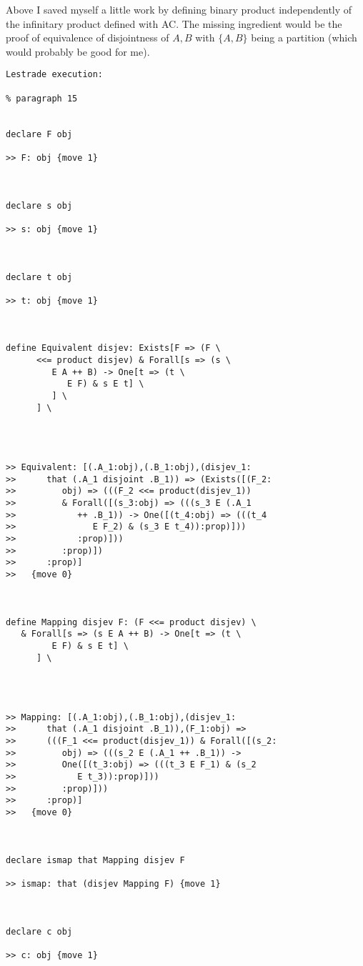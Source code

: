\documentclass[12pt]{article}
\begin{document}
Above I saved myself a little work by defining binary product independently of the infinitary product defined with AC.  The missing ingredient would be the proof of equivalence
of disjointness of $A,B$ with $\{A,B\}$ being a partition (which would probably be good for me).

\begin{verbatim}Lestrade execution:

% paragraph 15


declare F obj

>> F: obj {move 1}



declare s obj

>> s: obj {move 1}



declare t obj

>> t: obj {move 1}



define Equivalent disjev: Exists[F => (F \
      <<= product disjev) & Forall[s => (s \
         E A ++ B) -> One[t => (t \
            E F) & s E t] \
         ] \
      ] \
   



>> Equivalent: [(.A_1:obj),(.B_1:obj),(disjev_1:
>>      that (.A_1 disjoint .B_1)) => (Exists([(F_2:
>>         obj) => (((F_2 <<= product(disjev_1))
>>         & Forall([(s_3:obj) => (((s_3 E (.A_1
>>            ++ .B_1)) -> One([(t_4:obj) => (((t_4
>>               E F_2) & (s_3 E t_4)):prop)]))
>>            :prop)]))
>>         :prop)])
>>      :prop)]
>>   {move 0}



define Mapping disjev F: (F <<= product disjev) \
   & Forall[s => (s E A ++ B) -> One[t => (t \
         E F) & s E t] \
      ] \
   



>> Mapping: [(.A_1:obj),(.B_1:obj),(disjev_1:
>>      that (.A_1 disjoint .B_1)),(F_1:obj) =>
>>      (((F_1 <<= product(disjev_1)) & Forall([(s_2:
>>         obj) => (((s_2 E (.A_1 ++ .B_1)) ->
>>         One([(t_3:obj) => (((t_3 E F_1) & (s_2
>>            E t_3)):prop)]))
>>         :prop)]))
>>      :prop)]
>>   {move 0}



declare ismap that Mapping disjev F

>> ismap: that (disjev Mapping F) {move 1}



declare c obj

>> c: obj {move 1}




\end{verbatim}
\end{document}
